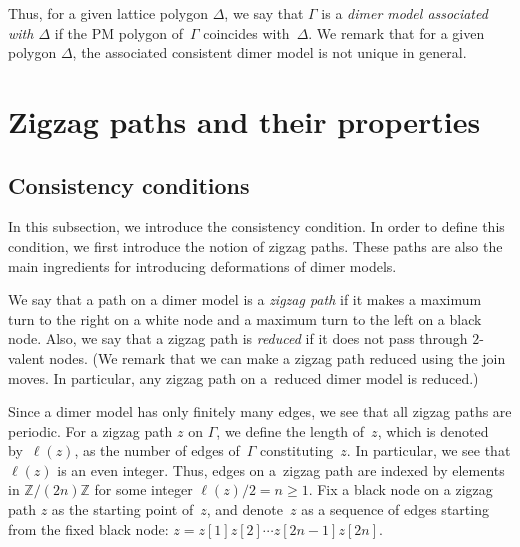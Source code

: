 \documentclass[pdftex]{sigma}%
\numberwithin{equation}{section}
\numberwithin{figure}{section}
\numberwithin{table}{section}
\newcommand{\ZZ}{\mathbb{Z}}
\begin{document}
Thus, for a given lattice polygon $\Delta$, we say that $\Gamma$ is a \emph{dimer model associated with $\Delta$} if the PM polygon of~$\Gamma$ coincides with~$\Delta$.
We remark that for a given polygon $\Delta$, the associated consistent dimer model is not unique in general.

\section{Zigzag paths and their properties}\label{sec_zigzag}

\subsection{Consistency conditions}\label{subsec_consistency}

In this subsection, we introduce the consistency condition.
In order to define this condition, we first introduce the notion of zigzag paths.
These paths are also the main ingredients for introducing deformations of dimer models.

\begin{Definition}We say that a path on a dimer model is a \emph{zigzag path} if it makes a maximum turn to the right on a white node and a maximum turn to the left on a black node.
Also, we say that a zigzag path is \emph{reduced} if it does not pass through $2$-valent nodes.
(We remark that we can make a zigzag path reduced using the join moves. In particular, any zigzag path on a~reduced dimer model is reduced.)
\end{Definition}

Since a dimer model has only finitely many edges, we see that all zigzag paths are periodic.
For a zigzag path $z$ on $\Gamma$, we define the length of~$z$, which is denoted by~$\ell(z)$, as the number of edges of~$\Gamma$ constituting~$z$.
In particular, we see that $\ell(z)$ is an even integer.
Thus, edges on a~zigzag path are indexed by elements in $\ZZ/(2n)\ZZ$ for some integer $\ell(z)/2=n\ge 1$.
Fix a black node on a zigzag path $z$ as the starting point of~$z$, and denote~$z$ as a sequence of edges starting from the fixed black node:
$z=z[1]z[2]\cdots z[2n-1]z[2n]$.
\end{document}
